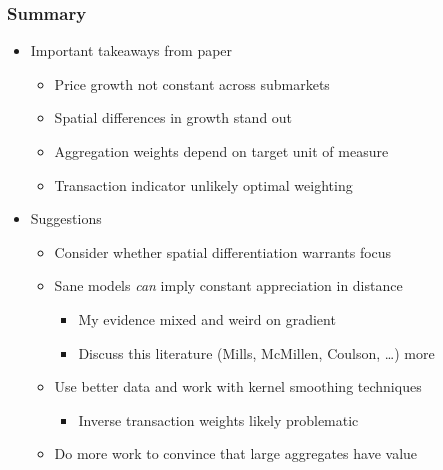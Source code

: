 \documentclass{beamer}
\begin{document}
\begin{frame}
	\frametitle{Summary}
	\begin{itemize}
		\item Important takeaways from paper
			\begin{itemize}
				\item Price growth not constant across submarkets
				\item Spatial differences in growth stand out
				\item Aggregation weights depend on target unit of measure
				\item Transaction indicator unlikely optimal weighting
			\end{itemize}
		\item Suggestions
			\begin{itemize}
				\item Consider whether spatial differentiation warrants focus
				\item Sane models \emph{can} imply constant appreciation in distance
					\begin{itemize}
						\item My evidence mixed and weird on gradient
						\item Discuss this literature (Mills, McMillen, Coulson, \dots ) more
					\end{itemize}
				\item Use better data and work with kernel smoothing techniques
					\begin{itemize}
						\item Inverse transaction weights likely problematic
					\end{itemize}
				\item Do more work to convince that large aggregates have value
			\end{itemize}
	\end{itemize}
\end{frame}
\end{document}
